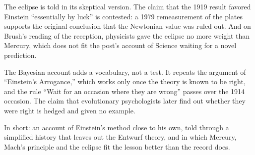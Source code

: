 \begin{afterword}
The eclipse is told in its skeptical version. The claim that the 1919 result favored Einstein ``essentially by luck'' is contested: a 1979 remeasurement of the plates supports the original conclusion that the Newtonian value was ruled out. And on Brush's reading of the reception, physicists gave the eclipse no more weight than Mercury, which does not fit the post's account of Science waiting for a novel prediction.

The Bayesian account adds a vocabulary, not a test. It repeats the argument of ``Einstein's Arrogance,'' which works only once the theory is known to be right, and the rule ``Wait for an occasion where they are wrong'' passes over the 1914 occasion. The claim that evolutionary psychologists later find out whether they were right is hedged and given no example.

In short: an account of Einstein's method close to his own, told through a simplified history that leaves out the Entwurf theory, and in which Mercury, Mach's principle and the eclipse fit the lesson better than the record does.
\end{afterword}
